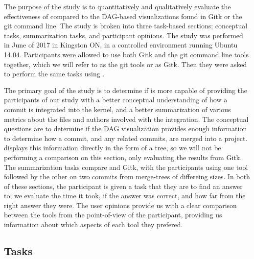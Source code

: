 The purpose of the study is to quantitatively and qualitatively evaluate
the effectiveness of \tool compared to the DAG-based visualizations
found in Gitk or the git command line. The study is broken into three
task-based sections; conceptual tasks, summarization tasks, and
participant opinions. The study was performed in June of 2017 in
Kingston ON, in a controlled environment running Ubuntu 14.04.
Participants were allowed to use both Gitk and the git command line
tools together, which we will refer to as the git tools or as Gitk. Then
they were asked to perform the same tasks using \tool.


The primary goal of the study is to determine if \tool is more capable
of providing the participants of our study with a better conceptual
understanding of how a commit is integrated into the kernel, and a
better summarization of various metrics about the files and authors
involved with the integration. The conceptual questions are to determine
if the DAG visualization provides enough information to determine how a
commit, and any related commits, are merged into a project. \tool
displays this information directly in the form of a tree, so we will not
be performing a comparison on this section, only evaluating the results
from Gitk. The summarization tasks compare \tool and Gitk, with the
participants using one tool followed by the other on two commits from
merge-trees of differeing sizes. In both of these sections, the
participant is given a task that they are to find an answer to; we
evaluate the time it took, if the answer was correct, and how far from
the right answer they were. The user opinions provide us with a clear
comparison between the tools from the point-of-view of the participant,
providing us information about which aspects of each tool they prefered.


\subsection{Tasks}
\label{sub:tasks}



